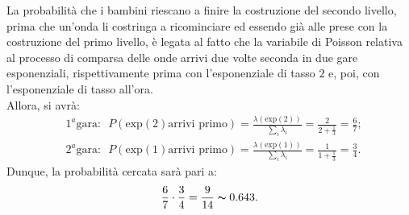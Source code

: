 \documentclass[11pt,largemargins]{homework}
\begin{document}
\begin{alphaparts}
\questionpart
La probabilità che i bambini riescano a finire la costruzione del secondo livello, prima che un'onda li costringa a ricominciare ed essendo già alle prese con la costruzione del primo livello, è legata al fatto che la variabile di Poisson relativa al processo di comparsa delle onde arrivi due volte seconda in due gare esponenziali, rispettivamente prima con l'esponenziale di tasso $2$ e, poi, con l'esponenziale di tasso all'ora.\\
Allora, si avrà:
\begin{align*}
&1^{a} \text{gara}: \,\,\, P\left(\text{exp}\left(2\right) \text{arrivi primo}\right)=\frac{\lambda\left(\text{exp}\left(2\right)\right)}{\sum_{i}\lambda_{i}}=\frac{2}{2+\frac{1}{3}}=\frac{6}{7};\\
&2^{a} \text{gara}: \,\,\, P\left(\text{exp}\left(1\right) \text{arrivi primo}\right)=\frac{\lambda\left(\text{exp}\left(1\right)\right)}{\sum_{i}\lambda_{i}}=\frac{1}{1+\frac{1}{3}}=\frac{3}{4}.
\end{align*}  
Dunque, la probabilità cercata sarà pari a:
\begin{equation*}
\frac{6}{7}\cdot \frac{3}{4}=\frac{9}{14}\thicksim 0.643.
\end{equation*}
 \end{alphaparts}
    
    
\newpage
\end{document}

